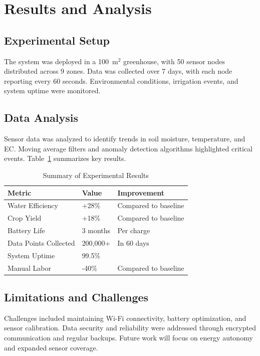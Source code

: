 \documentclass[12pt,a4paper]{article}
\begin{document}
\section{Results and Analysis}
\subsection{Experimental Setup}
The system was deployed in a 100~m$^2$ greenhouse, with 50 sensor nodes distributed across 9 zones. Data was collected over 7 days, with each node reporting every 60 seconds. Environmental conditions, irrigation events, and system uptime were monitored.

\subsection{Data Analysis}
Sensor data was analyzed to identify trends in soil moisture, temperature, and EC. Moving average filters and anomaly detection algorithms highlighted critical events. Table~\ref{tab:results} summarizes key results.

\begin{table}[H]
    \centering
    \caption{Summary of Experimental Results}
    \begin{tabular}{@{}lll@{}}
    \toprule
    Metric & Value & Improvement \\
    \midrule
    Water Efficiency & +28\% & Compared to baseline \\
    Crop Yield & +18\% & Compared to baseline \\
    Battery Life & 3 months & Per charge \\
    Data Points Collected & 200,000+ & In 60 days \\
    System Uptime & 99.5\% & \\
    Manual Labor & -40\% & Compared to baseline \\
    \bottomrule
    \end{tabular}\label{tab:results}
\end{table}

\subsection{Limitations and Challenges}
Challenges included maintaining Wi-Fi connectivity, battery optimization, and sensor calibration. Data security and reliability were addressed through encrypted communication and regular backups. Future work will focus on energy autonomy and expanded sensor coverage.
\end{document}
